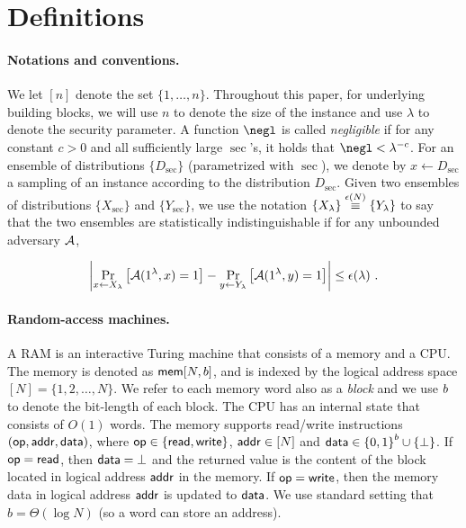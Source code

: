 
\newcommand{\memsize}{{N}}
\newcommand{\blocksize}{{b}}
\section{Definitions}
\label{sec:defs}

\paragraph{Notations and conventions.}
We let $[n]$ denote the set $\{1,\ldots,n\}$. Throughout this paper, for underlying building blocks, we will use
$n$ to denote the size of the instance and use $\lambda$ 
to denote the security parameter. 
A function $\negl$ is called \emph{negligible} if for any constant $c > 0$ and all sufficiently large $\sec$'s, it holds that $\negl < \sec^{-c}$. 
For an ensemble of distributions $\{D_\sec\}$ (parametrized with $\sec$),
we denote by $x \leftarrow D_\sec$ a sampling of an instance according to the distribution $D_\sec$. 
Given two ensembles of distributions $\{X_\sec\}$ and $\{Y_\sec\}$, 
we use the notation $\{X_{\lambda}\} \overset{{\epsilon}(N)}{\equiv} \{Y_{\lambda}\}$ 
to say that the two ensembles are statistically indistinguishable if for any unbounded adversary ${\cal A}$, 

$$
\left|\Pr_{x\leftarrow X_\sec}\left[\A(1^\lambda, x)=1\right] - \Pr_{y\leftarrow Y_\sec}\left[\A(1^\lambda, y)=1\right] \right| \leq \e(\sec) \ .
$$

\paragraph{Random-access machines.}
A RAM is an interactive Turing machine that consists of a memory and a CPU.  The
memory is denoted as $\mem[\memsize,\blocksize]$, and is indexed by the logical
address space $[N] = \{1,2,\ldots,N\}$. We refer to each memory word also as a
\emph{block} and we use $b$ to denote the bit-length of each block. The CPU
has an internal state that consists of $O(1)$ words. The memory supports read/write
instructions $(\mathsf{op},{\mathsf{addr}}, {\mathsf{data}})$, where $\mathsf{op} \in \{{\mathsf{read}},{\mathsf{write}}\}$, ${\mathsf{addr}} \in
[N]$ and ${\mathsf{data}} \in {\{0,1\}}^{b} \cup \{\bot\}$.  If $\mathsf{op} = {\mathsf{read}}$, then
${\mathsf{data}}=\bot$ and the returned value is the content of the block located in
logical address ${\mathsf{addr}}$ in the memory. If $\mathsf{op}={\mathsf{write}}$, then the memory data in
logical address ${\mathsf{addr}}$ is updated to ${\mathsf{data}}$.
We use standard setting that $\blocksize = \Theta(\log N)$ (so a word can 
store an address).

